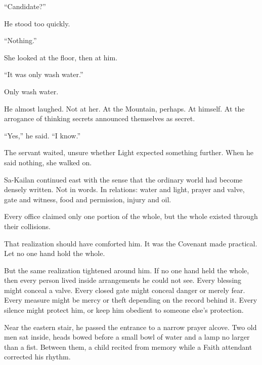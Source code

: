 “Candidate?”\par

He stood too quickly.\par

“Nothing.”\par

She looked at the floor, then at him.\par

“It was only wash water.”\par

Only wash water.\par

He almost laughed.
Not at her.
At the Mountain, perhaps.
At himself.
At the arrogance of thinking secrets announced themselves as secret.\par

“Yes,” he said.
“I know.”\par

The servant waited, unsure whether Light expected something further.
When he said nothing, she walked on.\par

Sa-Kailan continued east with the sense that the ordinary world had become densely written.
Not in words.
In relations: water and light, prayer and valve, gate and witness, food and permission, injury and oil.\par

Every office claimed only one portion of the whole, but the whole existed through their collisions.\par

That realization should have comforted him.
It was the Covenant made practical.
Let no one hand hold the whole.\par

But the same realization tightened around him.
If no one hand held the whole, then every person lived inside arrangements he could not see.
Every blessing might conceal a valve.
Every closed gate might conceal danger or merely fear.
Every measure might be mercy or theft depending on the record behind it.
Every silence might protect him, or keep him obedient to someone else’s protection.\par

Near the eastern stair, he passed the entrance to a narrow prayer alcove.
Two old men sat inside, heads bowed before a small bowl of water and a lamp no larger than a fist.
Between them, a child recited from memory while a Faith attendant corrected his rhythm.\par

